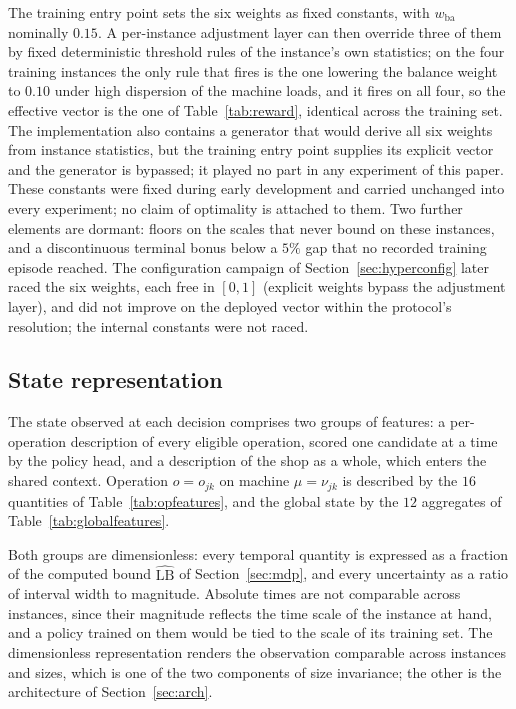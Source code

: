 \documentclass[preprint,authoryear,12pt]{elsarticle}
\newcommand{\LBi}{\widehat{\mathrm{LB}}}
\theoremstyle{definition}
\theoremstyle{remark}
\begin{document}
The training entry point sets the six weights as fixed constants,
with $w_{\mathrm{ba}}$ nominally $0.15$. A per-instance adjustment
layer can then override three of them by fixed deterministic
threshold rules of the instance's own statistics; on the four
training instances the only rule that fires is the one lowering the
balance weight to $0.10$ under high dispersion of the machine loads,
and it fires on all four, so the effective vector is the one of
Table~\ref{tab:reward}, identical across the training set. The
implementation also contains a generator that would derive all six
weights from instance statistics, but the training entry point
supplies its explicit vector and the generator is bypassed; it played
no part in any experiment of this paper. These constants were fixed
during early development and carried unchanged into every experiment;
no claim of optimality is attached to them. Two further elements are
dormant: floors on the scales that never bound on these instances,
and a discontinuous terminal bonus below a $5\%$ gap that no recorded
training episode reached. The configuration campaign of
Section~\ref{sec:hyperconfig} later raced the six weights, each free
in $[0,1]$ (explicit weights bypass the adjustment layer), and did
not improve on the deployed vector within the protocol's resolution;
the internal constants were not raced.

\subsection{State representation}
\label{sec:features}

The state observed at each decision comprises two groups of
features: a per-operation description of every eligible operation,
scored one candidate at a time by the policy head, and a description
of the shop as a whole, which enters the shared context. Operation
$o=o_{jk}$ on machine $\mu=\nu_{jk}$ is described by the $16$
quantities of Table~\ref{tab:opfeatures}, and the global state by the
$12$ aggregates of Table~\ref{tab:globalfeatures}.

Both groups are dimensionless: every temporal quantity is expressed
as a fraction of the computed bound $\LBi$ of Section~\ref{sec:mdp},
and every uncertainty as a ratio of interval width to magnitude.
Absolute times are not comparable across instances, since their
magnitude reflects the time scale of the instance at hand, and a
policy trained on them would be tied to the scale of its training
set. The dimensionless representation renders the observation
comparable across instances and sizes, which is one of the two
components of size invariance; the other is the architecture of
Section~\ref{sec:arch}.
\end{document}
